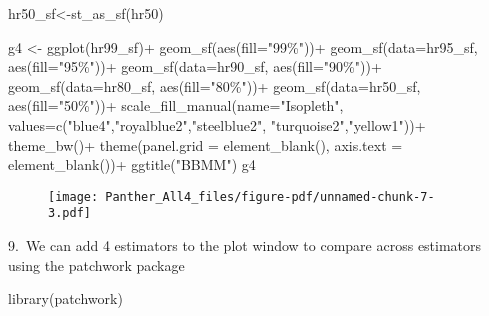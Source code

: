 \documentclass[
  letterpaper,
]{book}
\newenvironment{Shaded}{\begin{snugshade}}{\end{snugshade}}
\newcommand{\AttributeTok}[1]{\textcolor[rgb]{0.40,0.45,0.13}{#1}}
\newcommand{\FunctionTok}[1]{\textcolor[rgb]{0.28,0.35,0.67}{#1}}
\newcommand{\NormalTok}[1]{\textcolor[rgb]{0.00,0.23,0.31}{#1}}
\newcommand{\OtherTok}[1]{\textcolor[rgb]{0.00,0.23,0.31}{#1}}
\newcommand{\SpecialCharTok}[1]{\textcolor[rgb]{0.37,0.37,0.37}{#1}}
\newcommand{\StringTok}[1]{\textcolor[rgb]{0.13,0.47,0.30}{#1}}
\begin{document}
\begin{Shaded}
\begin{Highlighting}[]
\NormalTok{hr50\_sf}\OtherTok{\textless{}{-}}\FunctionTok{st\_as\_sf}\NormalTok{(hr50)}

\NormalTok{g4 }\OtherTok{\textless{}{-}} \FunctionTok{ggplot}\NormalTok{(hr99\_sf)}\SpecialCharTok{+}
  \FunctionTok{geom\_sf}\NormalTok{(}\FunctionTok{aes}\NormalTok{(}\AttributeTok{fill=}\StringTok{"99\%"}\NormalTok{))}\SpecialCharTok{+}
  \FunctionTok{geom\_sf}\NormalTok{(}\AttributeTok{data=}\NormalTok{hr95\_sf, }\FunctionTok{aes}\NormalTok{(}\AttributeTok{fill=}\StringTok{"95\%"}\NormalTok{))}\SpecialCharTok{+} 
  \FunctionTok{geom\_sf}\NormalTok{(}\AttributeTok{data=}\NormalTok{hr90\_sf, }\FunctionTok{aes}\NormalTok{(}\AttributeTok{fill=}\StringTok{"90\%"}\NormalTok{))}\SpecialCharTok{+}
  \FunctionTok{geom\_sf}\NormalTok{(}\AttributeTok{data=}\NormalTok{hr80\_sf, }\FunctionTok{aes}\NormalTok{(}\AttributeTok{fill=}\StringTok{"80\%"}\NormalTok{))}\SpecialCharTok{+}
  \FunctionTok{geom\_sf}\NormalTok{(}\AttributeTok{data=}\NormalTok{hr50\_sf, }\FunctionTok{aes}\NormalTok{(}\AttributeTok{fill=}\StringTok{"50\%"}\NormalTok{))}\SpecialCharTok{+}
  \FunctionTok{scale\_fill\_manual}\NormalTok{(}\AttributeTok{name=}\StringTok{"Isopleth"}\NormalTok{, }\AttributeTok{values=}\FunctionTok{c}\NormalTok{(}\StringTok{"blue4"}\NormalTok{,}\StringTok{"royalblue2"}\NormalTok{,}\StringTok{"steelblue2"}\NormalTok{, }\StringTok{"turquoise2"}\NormalTok{,}\StringTok{"yellow1"}\NormalTok{))}\SpecialCharTok{+}
  \FunctionTok{theme\_bw}\NormalTok{()}\SpecialCharTok{+}
  \FunctionTok{theme}\NormalTok{(}\AttributeTok{panel.grid =} \FunctionTok{element\_blank}\NormalTok{(), }\AttributeTok{axis.text =} \FunctionTok{element\_blank}\NormalTok{())}\SpecialCharTok{+}
  \FunctionTok{ggtitle}\NormalTok{(}\StringTok{"BBMM"}\NormalTok{)}
\NormalTok{g4}
\end{Highlighting}
\end{Shaded}

\begin{figure}[H]

{\centering \texttt{[image: Panther\_All4\_files/figure-pdf/unnamed-chunk-7-3.pdf]}

}

\end{figure}

9.~We can add 4 estimators to the plot window to compare across
estimators using the patchwork package

\begin{Shaded}
\begin{Highlighting}[]
\FunctionTok{library}\NormalTok{(patchwork)}
\end{Highlighting}
\end{Shaded}
\end{document}
